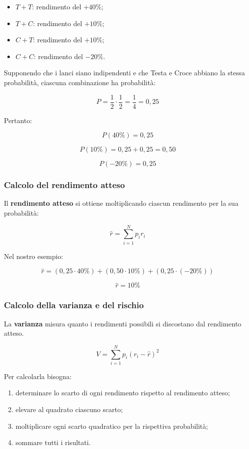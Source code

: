 \begin{itemize}
    \item $T+T$: rendimento del $+40\%$;
    \item $T+C$: rendimento del $+10\%$;
    \item $C+T$: rendimento del $+10\%$;
    \item $C+C$: rendimento del $-20\%$.
\end{itemize}

\noindent Supponendo che i lanci siano indipendenti
e che Testa e Croce abbiano la stessa probabilità,
ciascuna combinazione ha probabilità:

\[
P=\frac{1}{2}\cdot\frac{1}{2}
=\frac{1}{4}=0{,}25
\]

\noindent Pertanto:

\[
P(40\%)=0{,}25
\]

\[
P(10\%)=0{,}25+0{,}25=0{,}50
\]

\[
P(-20\%)=0{,}25
\]

\subsubsection*{Calcolo del rendimento atteso}

\noindent Il \textbf{rendimento atteso} si ottiene
moltiplicando ciascun rendimento per la sua probabilità:

\[
\boxed{
\hat{r}=\sum_{i=1}^{N}p_i r_i
}
\]

\noindent Nel nostro esempio:

\[
\hat{r}
=(0{,}25\cdot40\%)
+(0{,}50\cdot10\%)
+(0{,}25\cdot(-20\%))
\]

\[
\boxed{\hat{r}=10\%}
\]

\subsubsection*{Calcolo della varianza e del rischio}

\noindent La \textbf{varianza} misura quanto i rendimenti
possibili si discostano dal rendimento atteso.

\[
\boxed{
V=\sum_{i=1}^{N}p_i(r_i-\hat{r})^2
}
\]

\noindent Per calcolarla bisogna:

\begin{enumerate}
    \item determinare lo scarto di ogni rendimento
    rispetto al rendimento atteso;
    \item elevare al quadrato ciascuno scarto;
    \item moltiplicare ogni scarto quadratico
    per la rispettiva probabilità;
    \item sommare tutti i risultati.
\end{enumerate}

